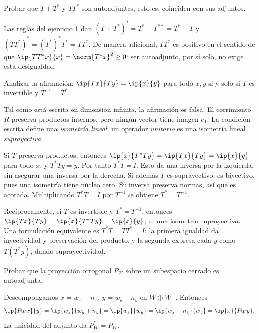 \begin{ejercicio}
Probar que $T+T^*$ y $TT^*$ son autoadjuntos, esto es, coinciden con sus adjuntos.
\end{ejercicio}
\begin{solucion}
Las reglas del ejercicio 1 dan $(T+T^*)^*=T^*+T^{**}=T^*+T$ y $(TT^*)^*=(T^*)^*T^*=TT^*$. De manera adicional, $TT^*$ es positivo en el sentido de que $\ip{TT^*x}{x}=\norm{T^*x}^{2}\geq0$; ser autoadjunto, por sí solo, no exige esta desigualdad.
\end{solucion}

\begin{ejercicio}
Analizar la afirmación: $\ip{Tx}{Ty}=\ip{x}{y}$ para todo $x,y$ si y solo si $T$ es invertible y $T^{-1}=T^*$.
\end{ejercicio}
\begin{solucion}
Tal como está escrita en dimensión infinita, la afirmación es falsa. El corrimiento $R$ preserva productos internos, pero ningún vector tiene imagen $e_1$. La condición escrita define una \emph{isometría lineal}; un operador \emph{unitario} es una isometría lineal \emph{suprayectiva}.

Si $T$ preserva productos, entonces $\ip{x}{T^*Ty}=\ip{Tx}{Ty}=\ip{x}{y}$ para todo $x$, y $T^*Ty=y$. Por tanto $T^*T=I$. Esto da una inversa por la izquierda, sin asegurar una inversa por la derecha. Si además $T$ es suprayectivo, es biyectivo, pues una isometría tiene núcleo cero. Su inversa preserva normas, así que es acotada. Multiplicando $T^*T=I$ por $T^{-1}$ se obtiene $T^*=T^{-1}$.

Recíprocamente, si $T$ es invertible y $T^*=T^{-1}$, entonces
$\ip{Tx}{Ty}=\ip{x}{T^*Ty}=\ip{x}{y}$; es una isometría suprayectiva. Una formulación equivalente es $T^*T=TT^*=I$: la primera igualdad da inyectividad y preservación del producto, y la segunda expresa cada $y$ como $T(T^*y)$, dando suprayectividad.
\end{solucion}

\begin{ejercicio}
Probar que la proyección ortogonal $P_W$ sobre un subespacio cerrado es autoadjunta.
\end{ejercicio}
\begin{solucion}
Descompongamos $x=w_x+n_x$, $y=w_y+n_y$ en $W\oplus W^{\perp}$. Entonces
\[
 \ip{P_Wx}{y}=\ip{w_x}{w_y+n_y}=\ip{w_x}{w_y}
 =\ip{w_x+n_x}{w_y}=\ip{x}{P_Wy}.
\]
La unicidad del adjunto da $P_W^*=P_W$.
\end{solucion}

